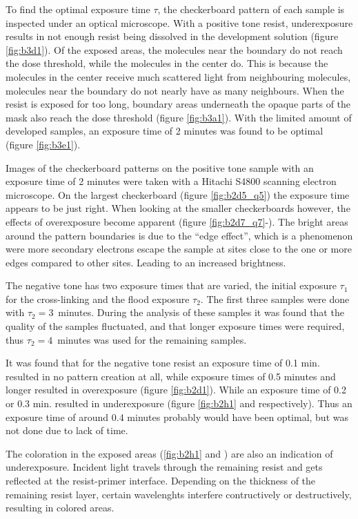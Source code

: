 To find the optimal exposure time $\tau$, the checkerboard pattern of each sample is inspected under an optical microscope. With a positive tone resist, underexposure results in not enough resist being dissolved in the development solution (figure \ref{fig:b3d1}). Of the exposed areas, the molecules near the boundary do not reach the dose threshold, while the molecules in the center do. This is because the molecules in the center receive much scattered light from neighbouring molecules, molecules near the boundary do not nearly have as many neighbours. When the resist is exposed for too long, boundary areas underneath the opaque parts of the mask also reach the dose threshold (figure \ref{fig:b3a1}). With the limited amount of developed samples, an exposure time of 2 minutes was found to be optimal (figure \ref{fig:b3e1}).

Images of the checkerboard patterns on the positive tone sample with an exposure time of 2 minutes were taken with a Hitachi S4800 scanning electron microscope. On the largest checkerboard (figure \ref{fig:b2d5_q5}) the exposure time appears to be just right. When looking at the smaller checkerboards however, the effects of overexposure become apparent (figure \ref{fig:b2d7_q7}-). The bright areas around the pattern boundaries is due to the ``edge effect'', which is a phenomenon were more secondary electrons escape the sample at sites close to the one or more edges compared to other sites. Leading to an increased brightness.

The negative tone has two exposure times that are varied, the initial exposure $\tau_1$ for the cross-linking and the flood exposure $\tau_2$. The first three samples were done with $\tau_2 = 3$~minutes. During the analysis of these samples it was found that the quality of the samples fluctuated, and that longer exposure times were required, thus $\tau_2 = 4$~minutes was used for the remaining samples. 

It was found that for the negative tone resist an exposure time of 0.1 min. resulted in no pattern creation at all, while exposure times of 0.5 minutes and longer resulted in overexposure (figure \ref{fig:b2d1}). While an exposure time of 0.2 or 0.3 min. resulted in underexposure (figure \ref{fig:b2h1} and  respectively). Thus an exposure time of around 0.4 minutes probably would have been optimal, but was not done due to lack of time. 

The coloration in the exposed areas (\ref{fig:b2h1} and ) are also an indication of underexposure. Incident light travels through the remaining resist and gets reflected at the resist-primer interface. Depending on the thickness of the remaining resist layer, certain wavelenghts interfere contructively or destructively, resulting in colored areas. 

